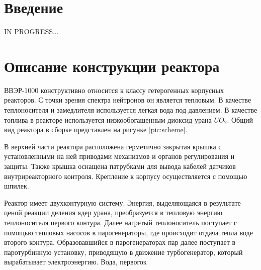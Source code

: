\section*{Введение}
%
IN PROGRESS...


\section{Описание конструкции реактора}
ВВЭР-1000 конструктивно относится к классу гетерогенных корпусных реакторов. С точки зрения спектра нейтронов он является тепловым. В качестве теплоносителя и замедлителя используется легкая вода под давлением. В качестве топлива в реакторе используется низкообогащенным диоксид урана $UO_2$. Общий вид реактора в сборке представлен на рисунке \ref{pic:scheme}. 


В верхней части реактора расположена герметично закрытая крышка с установленными на ней приводами механизмов и органов регулирования и защиты. Также крышка оснащена патрубками для вывода кабелей датчиков внутриреакторного контроля. Крепление  к корпусу осуществляется с помощью шпилек. 


Реактор имеет двухконтурную систему. Энергия, выделяющаяся в результате ценой реакции деления ядер урана, преобразуется в тепловую энергию теплоносителя первого контура. Далее нагретый теплоноситель поступает с помощью тепловых насосов в парогенераторы, где происходит отдача тепла воде второго контура. Образовавшийся в парогенераторах пар далее поступает в паротурбинную установку, приводящую в движение турбогенератор, который вырабатывает электроэнергию. Вода, первогок

